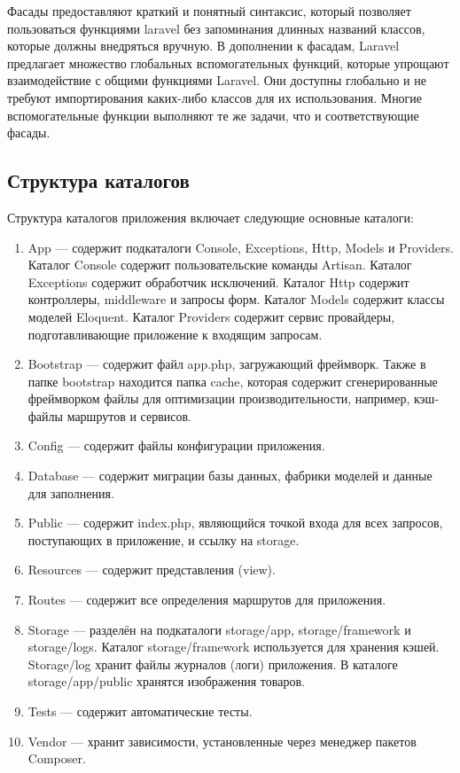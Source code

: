 Фасады предоставляют краткий и понятный синтаксис, который позволяет пользоваться функциями laravel без запоминания длинных названий классов, которые должны внедряться вручную. В дополнении к фасадам, Laravel предлагает множество глобальных вспомогательных функций, которые упрощают взаимодействие с общими функциями Laravel. Они доступны глобально и не требуют импортирования каких-либо классов для их использования. Многие вспомогательные функции выполняют те же задачи, что и соответствующие фасады.


\subsection{Структура каталогов}

Структура каталогов приложения включает следующие основные каталоги:
\begin{enumerate}
	\item App — содержит подкаталоги Console, Exceptions, Http, Models и Providers. Каталог Console содержит пользовательские команды Artisan. Каталог Exceptions содержит обработчик исключений. Каталог Http содержит контроллеры, middleware и запросы форм. Каталог Models содержит классы моделей Eloquent. Каталог Providers содержит сервис провайдеры, подготавливающие приложение к входящим запросам.
	\item Bootstrap — содержит файл app.php, загружающий фреймворк. Также в папке bootstrap находится папка cache, которая содержит сгенерированные фреймворком файлы для оптимизации производительности, например, кэш-файлы маршрутов и сервисов.
	\item Config — содержит файлы конфигурации приложения.
	\item Database — содержит миграции базы данных, фабрики моделей и данные для заполнения.
	\item Public — содержит index.php, являющийся точкой входа для всех запросов, поступающих в приложение, и ссылку на storage.
	\item Resources — содержит представления (view).
	\item Routes — содержит все определения маршрутов для приложения.
	\item Storage — разделён на подкаталоги storage/app, storage/framework и storage/logs. Каталог storage/framework используется для хранения кэшей. Storage/log хранит файлы журналов (логи) приложения. В каталоге storage/app/public хранятся изображения товаров.
	\item Tests — содержит автоматические тесты.
	\item Vendor — хранит зависимости, установленные через менеджер пакетов Composer. 
\end{enumerate}

